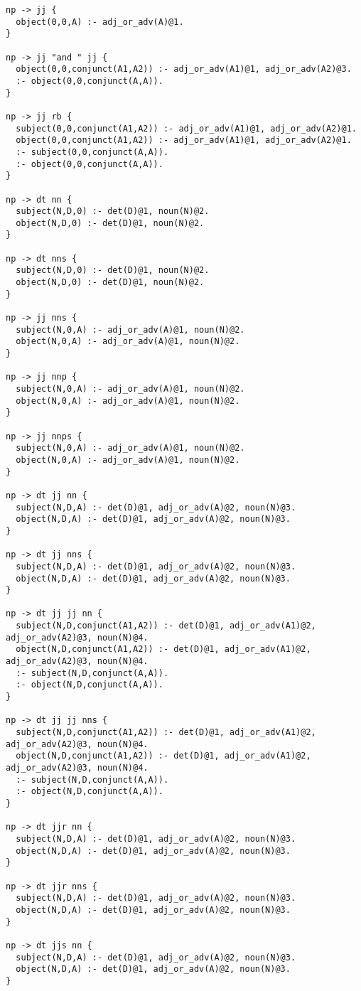 \begin{lstlisting}
np -> jj {
  object(0,0,A) :- adj_or_adv(A)@1.
}

np -> jj "and " jj {
  object(0,0,conjunct(A1,A2)) :- adj_or_adv(A1)@1, adj_or_adv(A2)@3.
  :- object(0,0,conjunct(A,A)).
}

np -> jj rb {
  subject(0,0,conjunct(A1,A2)) :- adj_or_adv(A1)@1, adj_or_adv(A2)@1.
  object(0,0,conjunct(A1,A2)) :- adj_or_adv(A1)@1, adj_or_adv(A2)@1.
  :- subject(0,0,conjunct(A,A)).
  :- object(0,0,conjunct(A,A)).
}

np -> dt nn {
  subject(N,D,0) :- det(D)@1, noun(N)@2.
  object(N,D,0) :- det(D)@1, noun(N)@2.
}

np -> dt nns {
  subject(N,D,0) :- det(D)@1, noun(N)@2.
  object(N,D,0) :- det(D)@1, noun(N)@2.
}

np -> jj nns {
  subject(N,0,A) :- adj_or_adv(A)@1, noun(N)@2.
  object(N,0,A) :- adj_or_adv(A)@1, noun(N)@2.
}

np -> jj nnp {
  subject(N,0,A) :- adj_or_adv(A)@1, noun(N)@2.
  object(N,0,A) :- adj_or_adv(A)@1, noun(N)@2.
}

np -> jj nnps {
  subject(N,0,A) :- adj_or_adv(A)@1, noun(N)@2.
  object(N,0,A) :- adj_or_adv(A)@1, noun(N)@2.
}

np -> dt jj nn {
  subject(N,D,A) :- det(D)@1, adj_or_adv(A)@2, noun(N)@3.
  object(N,D,A) :- det(D)@1, adj_or_adv(A)@2, noun(N)@3.
}

np -> dt jj nns {
  subject(N,D,A) :- det(D)@1, adj_or_adv(A)@2, noun(N)@3.
  object(N,D,A) :- det(D)@1, adj_or_adv(A)@2, noun(N)@3.
}

np -> dt jj jj nn {
  subject(N,D,conjunct(A1,A2)) :- det(D)@1, adj_or_adv(A1)@2, adj_or_adv(A2)@3, noun(N)@4.
  object(N,D,conjunct(A1,A2)) :- det(D)@1, adj_or_adv(A1)@2, adj_or_adv(A2)@3, noun(N)@4.
  :- subject(N,D,conjunct(A,A)).
  :- object(N,D,conjunct(A,A)).
}

np -> dt jj jj nns {
  subject(N,D,conjunct(A1,A2)) :- det(D)@1, adj_or_adv(A1)@2, adj_or_adv(A2)@3, noun(N)@4.
  object(N,D,conjunct(A1,A2)) :- det(D)@1, adj_or_adv(A1)@2, adj_or_adv(A2)@3, noun(N)@4.
  :- subject(N,D,conjunct(A,A)).
  :- object(N,D,conjunct(A,A)).
}

np -> dt jjr nn {
  subject(N,D,A) :- det(D)@1, adj_or_adv(A)@2, noun(N)@3.
  object(N,D,A) :- det(D)@1, adj_or_adv(A)@2, noun(N)@3.
}

np -> dt jjr nns {
  subject(N,D,A) :- det(D)@1, adj_or_adv(A)@2, noun(N)@3.
  object(N,D,A) :- det(D)@1, adj_or_adv(A)@2, noun(N)@3.
}

np -> dt jjs nn {
  subject(N,D,A) :- det(D)@1, adj_or_adv(A)@2, noun(N)@3.
  object(N,D,A) :- det(D)@1, adj_or_adv(A)@2, noun(N)@3.
}


\end{lstlisting}
